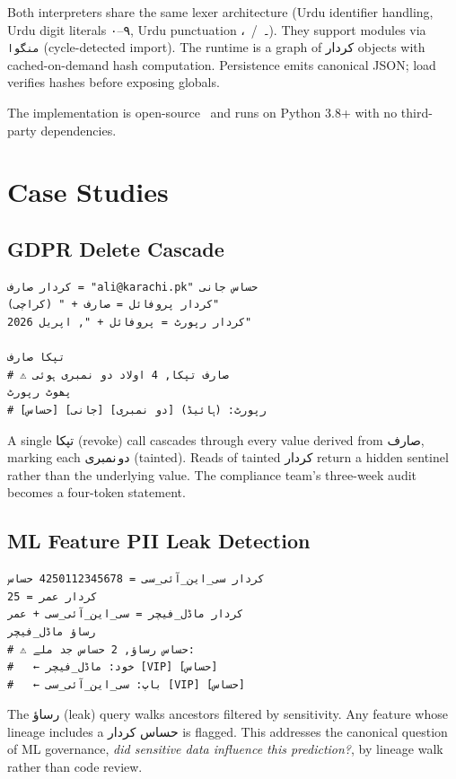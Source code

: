 \documentclass[10pt,twocolumn]{article}
\newcommand{\ur}[1]{{\urdufont #1}}
\begin{document}
Both interpreters share the same lexer architecture (Urdu identifier handling, Urdu digit literals \ur{۰}--\ur{۹}, Urdu punctuation \ur{،}~/~\ur{۔}). They support modules via \texttt{\ur{منگوا}} (cycle-detected import). The runtime is a graph of \ur{کردار} objects with cached-on-demand hash computation. Persistence emits canonical JSON; load verifies hashes before exposing globals.

The implementation is open-source~\cite{bhai-repo} and runs on Python 3.8+ with no third-party dependencies.

\section{Case Studies}
\label{sec:cases}

\subsection{GDPR Delete Cascade}

\begin{lstlisting}[caption={GDPR cascade in 7 lines.},captionpos=b]
کردار صارف = "ali@karachi.pk" حساس جانی
کردار پروفائل = صارف + " (کراچی)"
کردار رپورٹ = پروفائل + ", اپریل 2026"

تپکا صارف
# ⚠ صارف تپکا, 4 اولاد دو نمبری ہوئی
پھوٹ رپورٹ
# رپورٹ: (ہائیڈ) [دو نمبری] [جانی] [حساس]
\end{lstlisting}

A single \ur{تپکا} (revoke) call cascades through every value derived from \ur{صارف}, marking each \ur{دو\,نمبری} (tainted). Reads of tainted \ur{کردار} return a hidden sentinel rather than the underlying value. The compliance team's three-week audit becomes a four-token statement.

\subsection{ML Feature PII Leak Detection}

\begin{lstlisting}[caption={Feature provenance audit.},captionpos=b]
کردار سی_این_آئی_سی = 4250112345678 حساس
کردار عمر = 25
کردار ماڈل_فیچر = سی_این_آئی_سی + عمر
رساؤ ماڈل_فیچر
# ⚠ حساس رساؤ, 2 حساس جد ملے:
#   ← خود: ماڈل_فیچر [VIP] [حساس]
#   ← باپ: سی_این_آئی_سی [VIP] [حساس]
\end{lstlisting}

The \ur{رساؤ} (leak) query walks ancestors filtered by sensitivity. Any feature whose lineage includes a \ur{حساس} \ur{کردار} is flagged. This addresses the canonical question of ML governance, \emph{did sensitive data influence this prediction?}, by lineage walk rather than code review.
\end{document}
